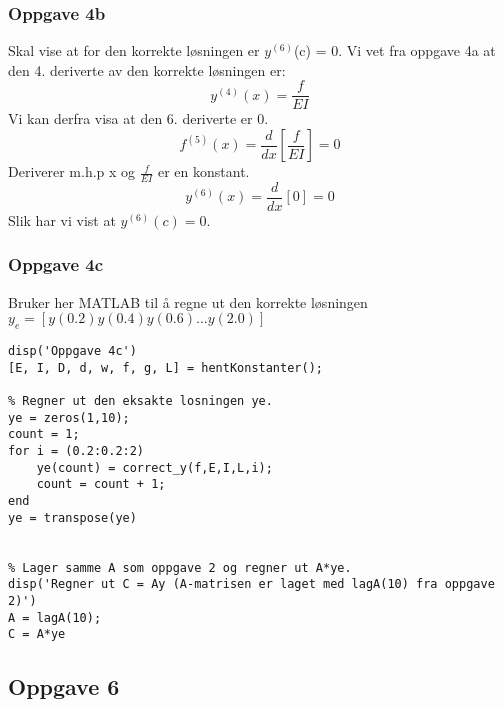 \subsubsection{Oppgave 4b}
Skal vise at for den korrekte løsningen er $y^{(6)}$(c) = 0. Vi vet fra oppgave 4a at den 4. deriverte av den korrekte løsningen er:
\begin{equation*}
y^{(4)}(x) = \frac{f}{EI}
\end{equation*}
Vi kan derfra visa at den 6. deriverte er 0.
\begin{equation}
f^{(5)}(x) = \frac{d}{dx}[\frac{f}{EI}] = 0
\end{equation}
Deriverer m.h.p x og $\frac{f}{EI}$ er en konstant.
\begin{equation}
y^{(6)}(x) = \frac{d}{dx}[0] = 0
\end{equation}
Slik har vi vist at $y^{(6)}(c) = 0$.

\subsubsection{Oppgave 4c}
Bruker her MATLAB til å regne ut den korrekte løsningen $y_e = [y(0.2) y(0.4) y(0.6) ... y(2.0)]$ 
\begin{lstlisting}
disp('Oppgave 4c')
[E, I, D, d, w, f, g, L] = hentKonstanter();

% Regner ut den eksakte losningen ye.
ye = zeros(1,10);
count = 1;
for i = (0.2:0.2:2)
    ye(count) = correct_y(f,E,I,L,i);
    count = count + 1;
end
ye = transpose(ye)


% Lager samme A som oppgave 2 og regner ut A*ye.
disp('Regner ut C = Ay (A-matrisen er laget med lagA(10) fra oppgave 2)')
A = lagA(10);
C = A*ye
\end{lstlisting}


\subsection{Oppgave 6}
